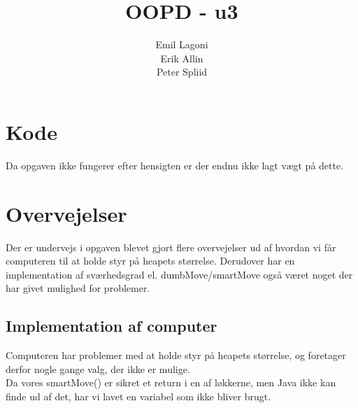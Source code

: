 \documentclass[a4paper,11pt]{article}
\title{\textbf{OOPD - u3}}
\author{Emil Lagoni\\Erik Allin\\Peter Spliid}
\begin{document}
\maketitle
\section*{Kode}
Da opgaven ikke fungerer efter hensigten er der endnu ikke lagt vægt på dette.

\section*{Overvejelser}
Der er undervejs i opgaven blevet gjort flere overvejelser ud af hvordan vi får computeren til at holde styr på heapets størrelse.
Derudover har en implementation af sværhedsgrad el. dumbMove/smartMove også været noget der har givet mulighed for problemer.

\subsection*{Implementation af computer}
Computeren har problemer med at holde styr på heapets størrelse, og foretager derfor nogle gange valg, der ikke er mulige.\\
Da vores smartMove() er sikret et return i en af løkkerne, men Java ikke kan finde ud af det, har vi lavet en variabel som ikke bliver brugt.
\end{document}
